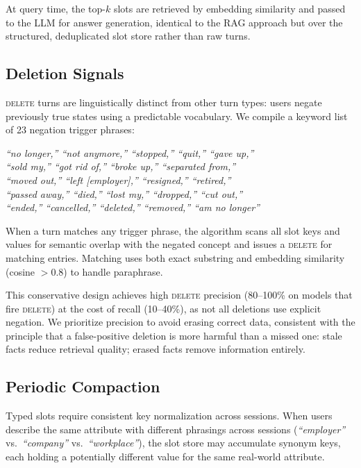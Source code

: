 \documentclass[10pt, twocolumn]{article}
\begin{document}
At query time, the top-$k$ slots are retrieved by embedding similarity
and passed to the LLM for answer generation, identical to the RAG approach
but over the structured, deduplicated slot store rather than raw turns.

\subsection{Deletion Signals}
\label{sec:deletion}

\textsc{delete} turns are linguistically distinct from other turn types:
users negate previously true states using a predictable vocabulary.
We compile a keyword list of 23 negation trigger phrases:

\smallskip
\noindent
\textit{``no longer,'' ``not anymore,'' ``stopped,'' ``quit,'' ``gave up,''}\\
\textit{``sold my,'' ``got rid of,'' ``broke up,'' ``separated from,''}\\
\textit{``moved out,'' ``left [employer],'' ``resigned,'' ``retired,''}\\
\textit{``passed away,'' ``died,'' ``lost my,'' ``dropped,'' ``cut out,''}\\
\textit{``ended,'' ``cancelled,'' ``deleted,'' ``removed,'' ``am no longer''}
\smallskip

When a turn matches any trigger phrase, the algorithm scans all slot keys
and values for semantic overlap with the negated concept and issues a
\textsc{delete} for matching entries.
Matching uses both exact substring and embedding similarity (cosine $> 0.8$)
to handle paraphrase.

This conservative design achieves high \textsc{delete} precision
(80--100\% on models that fire \textsc{delete}) at the cost of recall
(10--40\%), as not all deletions use explicit negation.
We prioritize precision to avoid erasing correct data, consistent with the
principle that a false-positive deletion is more harmful than a missed one:
stale facts reduce retrieval quality; erased facts remove information entirely.

\subsection{Periodic Compaction}
\label{sec:compaction}

Typed slots require consistent key normalization across sessions.
When users describe the same attribute with different phrasings across
sessions (\emph{``employer''} vs.\ \emph{``company''} vs.\
\emph{``workplace''}), the slot store may accumulate synonym keys, each
holding a potentially different value for the same real-world attribute.
\end{document}
